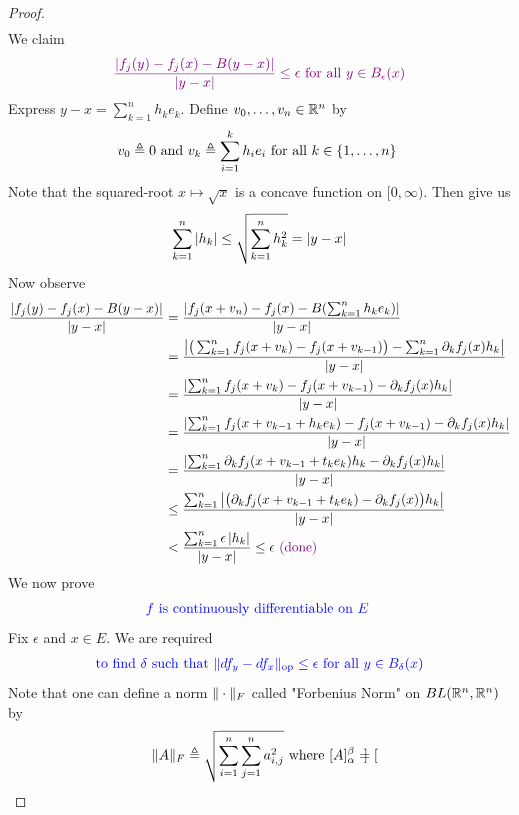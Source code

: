 \documentclass{report}
\begin{document}
\begin{proof}
\begin{align*}
\end{align*}
We claim 
\begin{align*}
  \textcolor{violet}{\frac{\left|f_j(y)-f_j(x)-B(y-x)\right|}{\left|y-x\right|}\leq \epsilon \text{ for all }y \in B_\epsilon (x)}
\end{align*}
Express $y-x=\sum_{k=1}^n h_ke_k$. Define $v_0,\dots,v_n\in\mathbb{R}^n$ by
\begin{align*}
v_0\triangleq 0\text{ and }v_k\triangleq \sum_{i=1}^k h_ie_i\text{ for all $k\in \{ 1,\dots ,n \}$ }
\end{align*}
Note that the squared-root $x\mapsto \sqrt{x}  $ is a concave function on $[0,\infty)$. Then  give us 
\begin{align*}
  \sum_{k=1}^n \left|h_k\right|\leq \sqrt{\sum_{k=1}^n h_k^2}=\left|y-x\right|  
\end{align*}
Now observe
\begin{align*}
\frac{\left|f_j(y)-f_j(x)-B(y-x)\right|}{\left|y-x\right|}&=\frac{\left|f_j(x+v_n)-f_j(x)-B(\sum_{k=1}^n h_ke_k)\right|}{\left|y-x\right|}\\
&=\frac{\left|\big(\sum_{k=1}^nf_j(x+v_k)-f_j(x+v_{k-1}) \big)- \sum_{k=1}^n \partial_k f_j(x)h_k   \right|}{\left|y-x\right|}\\
&=\frac{\left|\sum_{k=1}^n f_j(x+v_k)-f_j(x+v_{k-1})-\partial_k f_j(x)h_k\right|}{\left|y-x\right|}\\
&=\frac{\left|\sum_{k=1}^n f_j(x+v_{k-1}+h_ke_k)-f_j(x+v_{k-1})-\partial_k f_j(x)h_k\right|}{\left|y-x\right|}\\
&=\frac{\left|\sum_{k=1}^n \partial_k f_j(x+v_{k-1}+t_ke_k)h_k-\partial_k f_j(x)h_k\right|}{\left|y-x\right|}\\
&\leq \frac{\sum_{k=1}^n \left|\big(\partial_k f_j(x+v_{k-1}+t_ke_k)-\partial_k f_j(x) \big)h_k\right|}{\left|y-x\right|}\\
&< \frac{\sum_{k=1}^n \epsilon \left|h_k\right|}{\left|y-x\right|}\leq \epsilon \textcolor{violet}{\text{ (done) }}
\end{align*}
We now prove
\begin{align*}
\textcolor{blue}{f\text{ is continuously differentiable on $E$ }}
\end{align*}
Fix $\epsilon $ and $x\in E$. We are required 
\begin{align*}
\textcolor{blue}{\text{ to find $\delta$ such that $\| df_y-df_x \|_\text{op}\leq \epsilon $ for all $y\in B_\delta (x)$ }}
\end{align*}
Note that one can define a norm $\| \cdot \|_F$ called "Forbenius Norm" on $BL(\mathbb{R}^n,\mathbb{R}^n)$ by 
\begin{align*}
\| A \|_F\triangleq \sqrt{\sum_{i=1}^n \sum_{j=1}^n a_{i,j}^2}  \text{ where }[A]_\alpha ^\beta = \begin{bmatrix}

\end{bmatrix}
\end{align*}
\end{proof}
\end{document}
